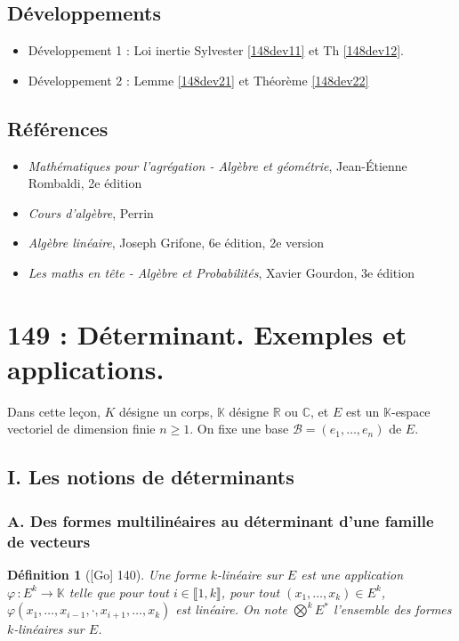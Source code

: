 \documentclass[10pt, a4paper, parskip=full, twoside, twocolumn]{report}
\newtheorem{definition}{Définition}
\newcommand{\IK}{\mathbb{K}}
\newcommand{\IC}{\mathbb{C}}
\newcommand{\IR}{\mathbb{R}}
\begin{document}
\section*{Développements}
\begin{itemize}
	\item Développement 1 : Loi inertie Sylvester \ref{148dev11} et Th \ref{148dev12}.
	\item Développement 2 : Lemme \ref{148dev21} et Théorème \ref{148dev22}
\end{itemize}

\section*{Références}
\begin{itemize}
	\item[R] \emph{Mathématiques pour l'agrégation - Algèbre et géométrie}, Jean-Étienne Rombaldi, 2e édition
	\item[P] \emph{Cours d'algèbre}, Perrin
	\item[Gr] \emph{Algèbre linéaire}, Joseph Grifone, 6e édition, 2e version
	\item[Go] \emph{Les maths en tête - Algèbre et Probabilités}, Xavier Gourdon, 3e édition  
\end{itemize}


\chapter*{149 : Déterminant. Exemples et applications.}
\setcounter{definition}{0}

\textcolor{paragraphtext}{Dans cette leçon, $K$ désigne un corps, $\IK$ désigne $\IR$ ou $\IC$, et $E$ est un $\IK$-espace vectoriel de dimension finie $n\geq 1$.
On fixe une base $\mathcal{B}=(e_1,\dots,e_n)$ de $E$.}

\section*{I. Les notions de déterminants}
\subsection*{A. Des formes multilinéaires au déterminant d'une famille de vecteurs}

\begin{definition}[\textnormal{[Go] 140}]
	Une \emph{forme $k$-linéaire sur $E$} est une application $\varphi\,\colon E^k\to \IK$ 
	telle que pour tout $i\in\llbracket 1,k\rrbracket$, pour tout $(x_1,\dots, x_k)\in E^k$, $\varphi(x_1,\dots, x_{i-1}, \cdot, x_{i+1},\dots, x_k)$
	est linéaire. On note $\bigotimes^k E^*$ l'ensemble des formes $k$-linéaires sur $E$.
\end{definition}
\end{document}
